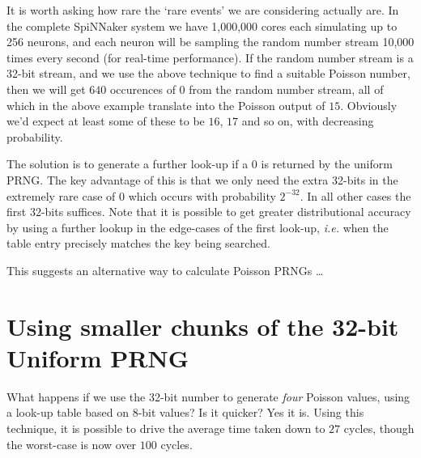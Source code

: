 It is worth asking how rare the `rare events' we are considering
actually are. In the complete SpiNNaker system we have 1,000,000 cores
each simulating up to 256 neurons, and each neuron will be sampling
the random number stream 10,000 times every second (for real-time
performance). If the random number stream is a 32-bit stream, and we
use the above technique to find a suitable Poisson number, then we
will get $640$ occurences of $0$ from the random number stream, all of
which in the above example translate into the Poisson output of
$15$. Obviously we'd expect at least some of these to be $16$, $17$
and so on, with decreasing probability.

The solution is to generate a further look-up if a $0$ is returned by
the uniform PRNG. The key advantage of this is that we only need the
extra 32-bits in the extremely rare case of $0$ which occurs with
probability $2^{-32}$. In all other cases the first 32-bits
suffices. Note that it is possible to get greater distributional
accuracy by using a further lookup in the edge-cases of the first
look-up, {\it i.e.} when the table entry precisely matches the key
being searched.

This suggests an alternative way to calculate Poisson PRNGs {\ldots}

\section{Using smaller chunks of the 32-bit Uniform PRNG}

What happens if we use the 32-bit number to generate {\em four}
Poisson values, using a look-up table based on 8-bit values? Is it
quicker? Yes it is. Using this technique, it is possible to drive the
average time taken down to $27$ cycles, though the worst-case is now
over $100$ cycles.

